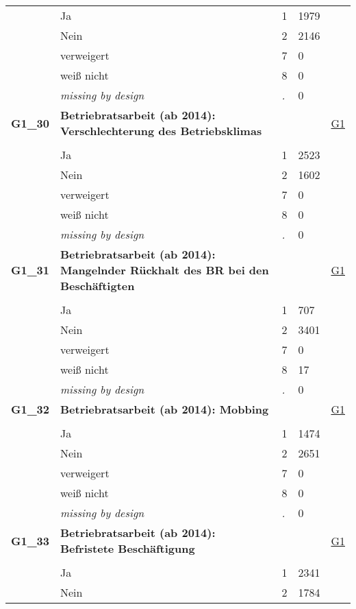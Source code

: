 \begin{longtable}{| L{2.65cm} | L{8cm} | C{1.5cm} | R{1.25cm} | C{2.25cm}  |}
   & Ja & 1 & 1979 &  \\ 
   & Nein & 2 & 2146 &  \\ 
   & verweigert & 7 & 0 &  \\ 
   & weiß nicht & 8 & 0 &  \\ 
   & \textit{missing by design} & \textit{.} & 0 &  \\ 
   \midrule
\textbf{G1\_30}\label{var:G1:30} & \textbf{Betriebratsarbeit (ab 2014): Verschlechterung des Betriebsklimas} &  &  & \hyperref[G1]{G1} \\ 
   &  &  &  &  \\ 
   & Ja & 1 & 2523 &  \\ 
   & Nein & 2 & 1602 &  \\ 
   & verweigert & 7 & 0 &  \\ 
   & weiß nicht & 8 & 0 &  \\ 
   & \textit{missing by design} & \textit{.} & 0 &  \\ 
   \midrule
\textbf{G1\_31}\label{var:G1:31} & \textbf{Betriebratsarbeit (ab 2014): Mangelnder Rückhalt des BR bei den Beschäftigten} &  &  & \hyperref[G1]{G1} \\ 
   &  &  &  &  \\ 
   & Ja & 1 & 707 &  \\ 
   & Nein & 2 & 3401 &  \\ 
   & verweigert & 7 & 0 &  \\ 
   & weiß nicht & 8 & 17 &  \\ 
   & \textit{missing by design} & \textit{.} & 0 &  \\ 
   \midrule
\textbf{G1\_32}\label{var:G1:32} & \textbf{Betriebratsarbeit (ab 2014): Mobbing} &  &  & \hyperref[G1]{G1} \\ 
   &  &  &  &  \\ 
   & Ja & 1 & 1474 &  \\ 
   & Nein & 2 & 2651 &  \\ 
   & verweigert & 7 & 0 &  \\ 
   & weiß nicht & 8 & 0 &  \\ 
   & \textit{missing by design} & \textit{.} & 0 &  \\ 
   \midrule
\textbf{G1\_33}\label{var:G1:33} & \textbf{Betriebratsarbeit (ab 2014): Befristete Beschäftigung} &  &  & \hyperref[G1]{G1} \\ 
   &  &  &  &  \\ 
   & Ja & 1 & 2341 &  \\ 
   & Nein & 2 & 1784 &  \\ 

\end{longtable}

